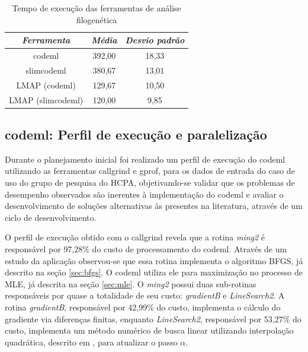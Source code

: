 \documentclass[cic,tc]{iiufrgs}
\begin{document}
\begin{table}[h]
    \caption{Tempo de execução das ferramentas de análise filogenética}
    \centering
        \begin{tabular}{c|c|c}
          \hline
          \textit{Ferramenta} & \textit{Média} & \textit{Desvio padrão} \\
          \hline
          \hline
          codeml            & 392,00 & 18,33 \\
          slimcodeml        & 380,67 & 13,01 \\
          LMAP (codeml)     & 129,67 & 10,50 \\
          LMAP (slimcodeml) & 120,00 & 9,85  \\
          \hline
        \end{tabular}
    \label{tbl:paml}
\end{table}

\subsection{codeml: Perfil de execução e paralelização}
\label{sec:codemlpar}

Durante o planejamento inicial foi realizado um perfil de execução do codeml
utilizando as ferramentas callgrind e gprof, para os dados de entrada do caso
de uso do grupo de pesquisa do HCPA, objetivando-se validar que os problemas de
desempenho observados são inerentes à implementação do codeml e avaliar o
desenvolvimento de soluções alternativas às presentes na literatura, através de
um ciclo de desenvolvimento. 

O perfil de execução obtido com o callgrind revela que a rotina \textit{ming2}
é responsável por 97,28\% do custo de processamento do codeml. Através de um
estudo da aplicação observou-se que essa rotina implementa o algoritmo BFGS,
já descrito na seção \ref{sec:bfgs}. O codeml utiliza ele para maximização no
processo de MLE, já descrita na seção \ref{sec:mle}. O \textit{ming2} possui duas
sub-rotinas responsáveis por quase a totalidade de seu custo:
\textit{gradientB} e \textit{LineSearch2}. A rotina \textit{gradientB},
responsável por 42,99\% do custo, implementa o cálculo do gradiente via
diferenças finitas, enquanto \textit{LineSearch2}, responsável por 53,27\% do
custo, implementa um método numérico de busca linear utilizando interpolação
quadrática, descrito em \cite{wolfe1978numerical}, para atualizar o passo
$\alpha$.
\end{document}
